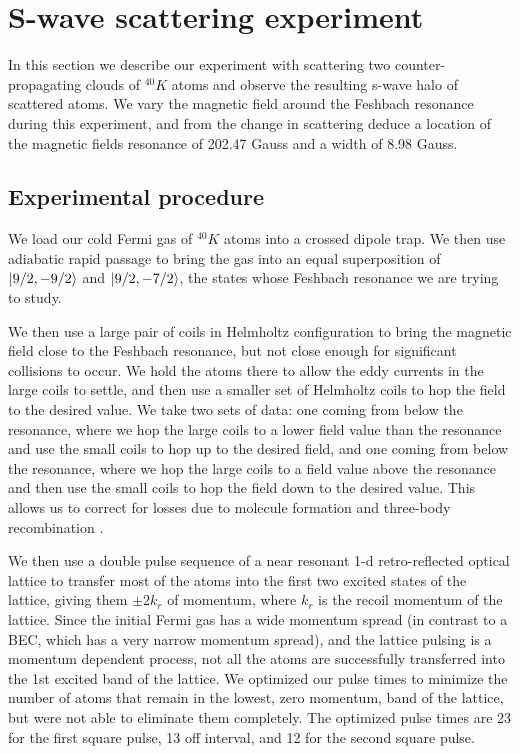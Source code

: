 \documentclass[12pt]{iopart}
\begin{document}
\section{S-wave scattering experiment}
In this section we describe our experiment with scattering two counter-propagating clouds of $^{40}K$ atoms and observe the resulting s-wave halo of scattered atoms. We vary the magnetic field around the Feshbach resonance during this experiment, and from the change in scattering deduce a location of the magnetic fields resonance of 202.47 Gauss and a width of 8.98 Gauss.
\subsection{Experimental procedure}
We load our cold Fermi gas of $^{40}K$ atoms into a crossed dipole trap. We then use adiabatic rapid passage to bring the gas into an equal superposition of $\mathinner{|{9/2,-9/2}\rangle}$ and $\mathinner{|{9/2,-7/2}\rangle}$, the states whose Feshbach resonance we are trying to study. 
\par We then use a large pair of  coils in Helmholtz configuration to bring the magnetic field close to the Feshbach resonance, but not close enough for significant collisions to occur. We hold the atoms there to allow the eddy currents in the large coils to settle, and then use a smaller set of Helmholtz coils to hop the field to the desired value. We take two sets of data: one coming from below the resonance, where we hop the large coils to a lower field value than the resonance and use the small coils to hop up to the desired field, and one coming from below the resonance, where we hop the large coils to a field value above the resonance and then use the small coils to hop the field down to the desired value. This allows us to correct for losses due to molecule formation and three-body recombination \cite{Chin10}.
\par We then use a double pulse sequence \cite{Wu05} of a near resonant 1-d retro-reflected optical lattice to transfer most of the atoms into the first two excited states of the lattice, giving them $\pm 2k_r$ of momentum, where $k_r$ is the recoil momentum of the lattice. Since the initial Fermi gas has a wide momentum spread (in contrast to a BEC, which has a very narrow momentum spread), and the lattice pulsing is a momentum dependent process, not all the atoms are successfully transferred into the 1st excited band of the lattice. We optimized our pulse times to minimize the number of atoms that remain in the lowest, zero momentum, band of the lattice, but were not able to eliminate them completely. The optimized pulse times are 23\us{} for the first square pulse, 13\us{} off interval, and 12\us{} for the second square pulse. 
\end{document}
